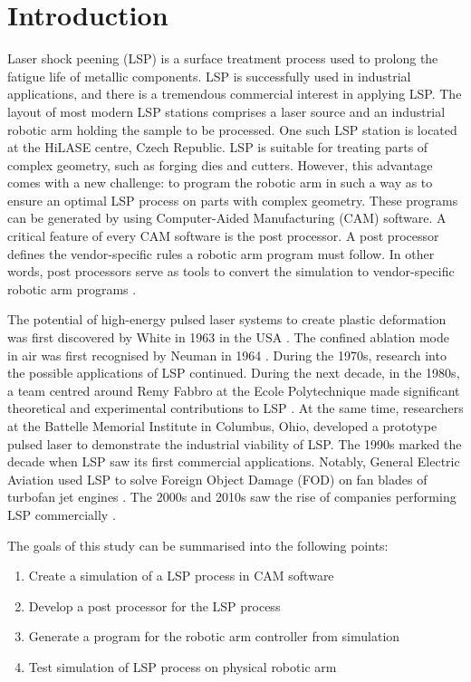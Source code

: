 \chapter{Introduction \label{ch:uvod}}




Laser shock peening (LSP) is a surface treatment process used to prolong the fatigue life of metallic components. LSP is successfully used in industrial applications, and there is a tremendous commercial interest in applying LSP. The layout of most modern LSP stations comprises a laser source and an industrial robotic arm holding the sample to be processed. One such LSP station is located at the HiLASE centre, Czech Republic. LSP is suitable for treating parts of complex geometry, such as forging dies and cutters. However, this advantage comes with a new challenge: to program the robotic arm in such a way as to ensure an optimal LSP process on parts with complex geometry. These programs can be generated by using Computer-Aided Manufacturing (CAM) software. A critical feature of every CAM software is the post processor. A post processor defines the vendor-specific rules a robotic arm program must follow.  In other words, post processors serve as tools to convert the simulation to vendor-specific robotic arm programs \cite{ding_ye_2006}.

The potential of high-energy pulsed laser systems to create plastic deformation was first discovered by White in 1963 in the USA \cite{white_1963}. The confined ablation mode in air was first recognised by Neuman in 1964 \cite{neuman_1964}. During the 1970s, research into the possible applications of LSP continued. During the next decade, in the 1980s, a team centred around Remy Fabbro at the Ecole Polytechnique made significant theoretical and experimental contributions to LSP \cite{fabbro_fournier_ballard_devaux_virmont_1990}. At the same time, researchers at the Battelle Memorial Institute in Columbus, Ohio, developed a prototype pulsed laser to demonstrate the industrial viability of LSP. The 1990s marked the decade when LSP saw its first commercial applications. Notably, General Electric Aviation used LSP to solve Foreign Object Damage (FOD) on fan blades of turbofan jet engines \cite{airforce}. The 2000s and 2010s saw the rise of companies performing LSP commercially \cite{sano}.

The goals of this study can be summarised into the following points:
\begin{enumerate}

    \item Create a simulation of a LSP process in CAM software
    \item Develop a post processor for the LSP process 
    \item Generate a program  for the robotic arm controller from simulation
    \item Test simulation of LSP process on physical robotic arm

    
\end{enumerate}

